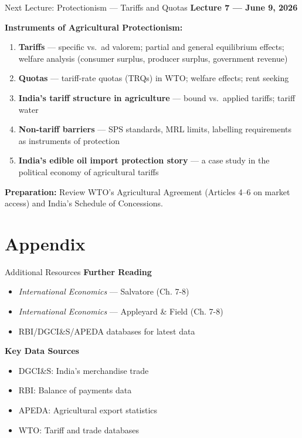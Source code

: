 \documentclass[
  ignorenonframetext,
  aspectratio=169,
]{beamer}
\makeatletter
\providecommand{\tightlist}{%
  \setlength{\itemsep}{0pt}\setlength{\parskip}{0pt}}
\let\quarto@originallabel\label
\DeclareRobustCommand*{\label}[1]{\quarto@originallabel{#1}}
\makeatother
\begin{document}
\begin{frame}{Next Lecture: Protectionism --- Tariffs and Quotas}
\label{next-lecture-protectionism-tariffs-and-quotas}
\textbf{Lecture 7 --- June 9, 2026}

\textbf{Instruments of Agricultural Protectionism:}

\begin{enumerate}
\tightlist
\item
  \textbf{Tariffs} --- specific vs.~ad valorem; partial and general
  equilibrium effects; welfare analysis (consumer surplus, producer
  surplus, government revenue)
\item
  \textbf{Quotas} --- tariff-rate quotas (TRQs) in WTO; welfare effects;
  rent seeking
\item
  \textbf{India's tariff structure in agriculture} --- bound vs.~applied
  tariffs; tariff water
\item
  \textbf{Non-tariff barriers} --- SPS standards, MRL limits, labelling
  requirements as instruments of protection
\item
  \textbf{India's edible oil import protection story} --- a case study
  in the political economy of agricultural tariffs
\end{enumerate}

\textbf{Preparation:} Review WTO's Agricultural Agreement (Articles 4--6
on market access) and India's Schedule of Concessions.
\end{frame}

\section{Appendix}\label{appendix}

\begin{frame}{Additional Resources}
\label{additional-resources}
\textbf{Further Reading}

\begin{itemize}
\tightlist
\item
  \emph{International Economics} --- Salvatore (Ch. 7-8)
\item
  \emph{International Economics} --- Appleyard \& Field (Ch. 7-8)
\item
  RBI/DGCI\&S/APEDA databases for latest data
\end{itemize}

\textbf{Key Data Sources}

\begin{itemize}
\tightlist
\item
  DGCI\&S: India's merchandise trade
\item
  RBI: Balance of payments data\\
\item
  APEDA: Agricultural export statistics
\item
  WTO: Tariff and trade databases
\end{itemize}
\end{frame}
\end{document}
